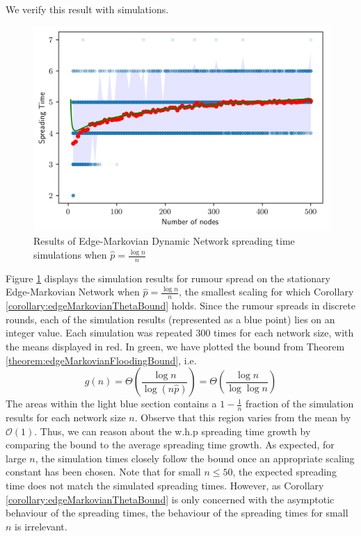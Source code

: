 We verify this result with simulations.

\begin{figure}[h]
	\centering
	\includegraphics[width=1\textwidth]{./figures/flooding_simulation_min_p_with_error.png}
	\caption{Results of Edge-Markovian Dynamic Network spreading time simulations when $\hat{p} = \frac{\log n}{n}$}
	\label{fig:floodingGnpSimResultsTight}
\end{figure}

Figure \ref{fig:floodingGnpSimResultsTight} displays the simulation results for rumour spread on the stationary Edge-Markovian Network when $\hat{p} = \frac{\log n}{n}$, the smallest scaling for which Corollary \ref{corollary:edgeMarkovianThetaBound} holds.
Since the rumour spreads in discrete rounds, each of the simulation results (represented as a blue point) lies on an integer value. Each simulation was repeated 300 times for each network size, with the means displayed in red. In green, we have plotted the bound from Theorem \ref{theorem:edgeMarkovianFloodingBound}, i.e.
$$
	g(n) 
	= \Theta\left(\frac{\log n}{\log (n\hat{p})}\right) 
	= \Theta\left(\frac{\log n}{\log \log n}\right)
$$
The areas within the light blue section contains a $1-\frac{1}{n}$ fraction of the simulation results for each network size $n$. Observe that this region varies from the mean by $\mathcal{O}(1)$. Thus, we can reason about the w.h.p spreading time growth by comparing the bound to the average spreading time growth. 
As expected, for large $n$, the simulation times closely follow the bound once an appropriate scaling constant has been chosen. Note that for small $n \leq 50$, the expected spreading time does not match the simulated spreading times. However, as Corollary \ref{corollary:edgeMarkovianThetaBound} is only concerned with the asymptotic behaviour of the spreading times, the behaviour of the spreading times for small $n$ is irrelevant.

